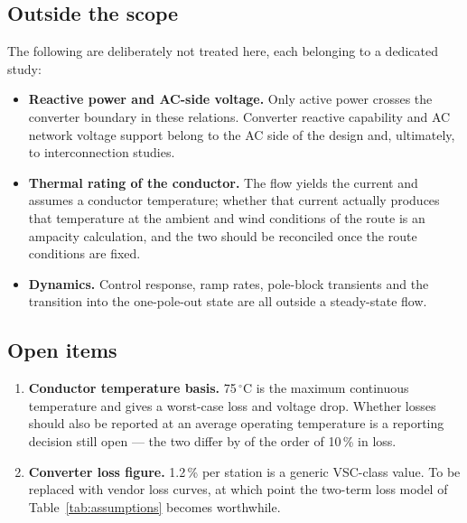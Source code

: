 \subsection{Outside the scope}
The following are deliberately not treated here, each belonging to a dedicated
study:

\begin{itemize}\setlength{\itemsep}{0.3em}
  \item \textbf{Reactive power and AC-side voltage.} Only active power crosses
        the converter boundary in these relations. Converter reactive
        capability and AC network voltage support belong to the AC side of the
        design and, ultimately, to interconnection studies.
  \item \textbf{Thermal rating of the conductor.} The flow yields the current
        and assumes a conductor temperature; whether that current actually
        produces that temperature at the ambient and wind conditions of the
        route is an ampacity calculation, and the two should be reconciled
        once the route conditions are fixed.
  \item \textbf{Dynamics.} Control response, ramp rates, pole-block
        transients and the transition into the one-pole-out state are all
        outside a steady-state flow.
\end{itemize}

\subsection{Open items}
\begin{enumerate}[label=(\arabic*)]
  \item \textbf{Conductor temperature basis.} 75\,$^{\circ}$C is the maximum
        continuous temperature and gives a worst-case loss and voltage drop.
        Whether losses should also be reported at an average operating
        temperature is a reporting decision still open --- the two differ by
        of the order of 10\,\% in loss.
  \item \textbf{Converter loss figure.} 1.2\,\% per station is a generic
        VSC-class value. To be replaced with vendor loss curves, at which
        point the two-term loss model of Table~\ref{tab:assumptions} becomes
        worthwhile.
\end{enumerate}
